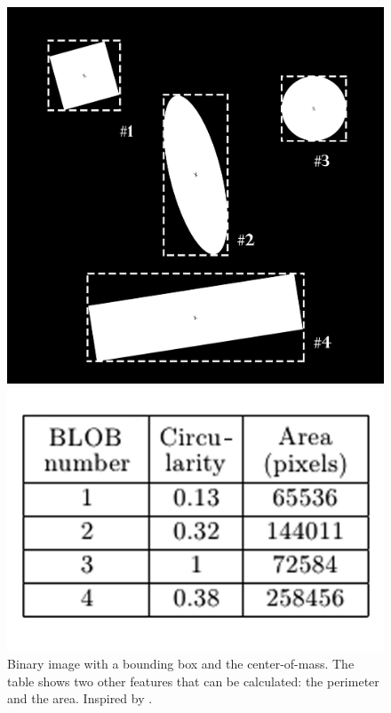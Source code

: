 {\begin{figure}[ht]
\begin{minipage}[b]{0.45\linewidth}
\centering
\includegraphics[width=1\textwidth]{Pictures/Theory/binary_image.png}
\end{minipage}
\hspace{0.5cm}	
\begin{minipage}[b]{0.45\linewidth}
\centering
\includegraphics[width=1\textwidth]{Pictures/Theory/binary_image_table.png}
\end{minipage}
\label{fig:BinaryIm}
\caption{Binary image with a bounding box and the center-of-mass. The table shows two other features that can be calculated: the perimeter and the area. Inspired by \citep{ip_book}.}
\end{figure}

}
